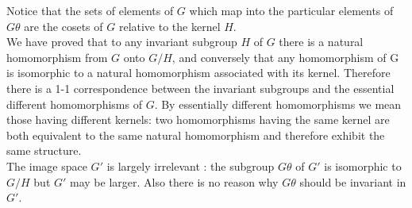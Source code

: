 Notice that the sets of elements of $G$ which map into the particular elements of $G\theta$ are the cosets of $G$ relative to the kernel $H$. \\

We have proved that to any invariant subgroup $H$ of $G$ there is a natural homomorphism from $G$ onto $G/H$, and conversely that any homomorphism of G is  isomorphic to
a natural homomorphism associated with its kernel. Therefore there is a 1-1 correspondence between the invariant subgroups and the essential different homomorphisms of $G$. By 
essentially different homomorphisms we mean those having different kernels: two homomorphisms having the same kernel are both equivalent to the same natural homomorphism and therefore exhibit the same structure.\\ 

The image space $G'$ is largely irrelevant : the subgroup $G\theta$ of $G'$ is isomorphic to $G/H$ but $G'$ may be larger. Also there is no reason why $G\theta$ should be invariant in $G'$. \\